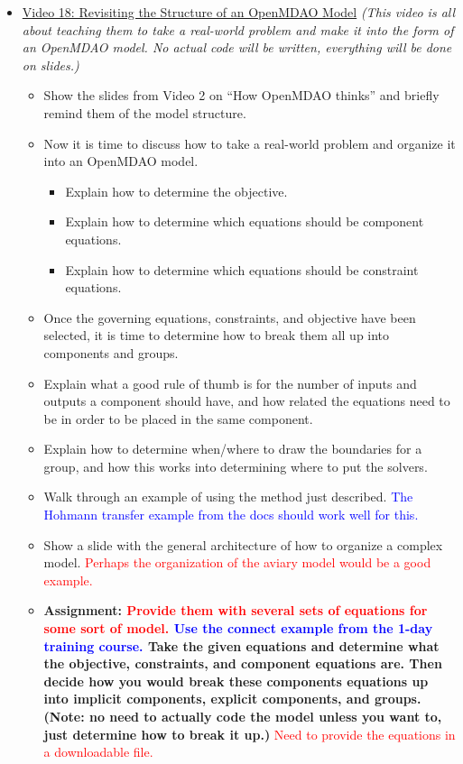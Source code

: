 \documentclass[12pt, letterpaper]{article}
\begin{document}
\begin{itemize}
	\item \underline{Video 18: Revisiting the Structure of an OpenMDAO Model} \textit{(This video is all about teaching them to take a real-world problem and make it into the form of an OpenMDAO model. No actual code will be written, everything will be done on slides.)}
		\begin{itemize}
			\item Show the slides from Video 2 on “How OpenMDAO thinks” and briefly remind them of the model structure.
			\item Now it is time to discuss how to take a real-world problem and organize it into an OpenMDAO model.
				\begin{itemize}
					\item Explain how to determine the objective.
					\item Explain how to determine which equations should be component equations.
					\item Explain how to determine which equations should be constraint equations.
				\end{itemize}
			\item Once the governing equations, constraints, and objective have been selected, it is time to determine how to break them all up into components and groups.
			\item Explain what a good rule of thumb is for the number of inputs and outputs a component should have, and how related the equations need to be in order to be placed in the same component.
			\item Explain how to determine when/where to draw the boundaries for a group, and how this works into determining where to put the solvers.
			\item Walk through an example of using the method just described. \textcolor{blue}{The Hohmann transfer example from the docs should work well for this.}
			\item Show a slide with the general architecture of how to organize a complex model. \textcolor{red}{Perhaps the organization of the aviary model would be a good example.}
			\item \textbf{Assignment: \textcolor{red}{Provide them with several sets of equations for some sort of model. \textcolor{blue}{Use the connect example from the 1-day training course.}} Take the given equations and determine what the objective, constraints, and component equations are. Then decide how you would break these components equations up into implicit components, explicit components, and groups. (Note: no need to actually code the model unless you want to, just determine how to break it up.)} \textcolor{red}{Need to provide the equations in a downloadable file.}
		\end{itemize}	
		

\end{itemize}
\end{document}
